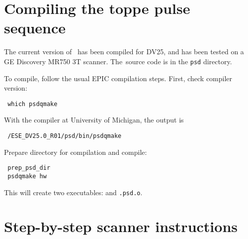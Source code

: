 \section{Compiling the toppe pulse sequence}

The current version of \toppe~has been compiled for DV25, and has been tested on a GE Discovery MR750 3T scanner.
The\toppe~source code is in the \texttt{psd} directory.

To compile, follow the usual EPIC compilation steps.
First, check compiler version:
\vspace{-10pt}
\begin{lstlisting}
 which psdqmake
\end{lstlisting}
With the compiler at University of Michigan, the output is 
\vspace{-10pt}
\begin{lstlisting}
 /ESE_DV25.0_R01/psd/bin/psdqmake
\end{lstlisting}

Prepare directory for compilation and compile:
\vspace{-10pt}
\begin{lstlisting}
 prep_psd_dir
 psdqmake hw
\end{lstlisting}
This will create two executables: {\tt \psdname} and {\tt \psdname.psd.o}.




\section{Step-by-step scanner instructions}

